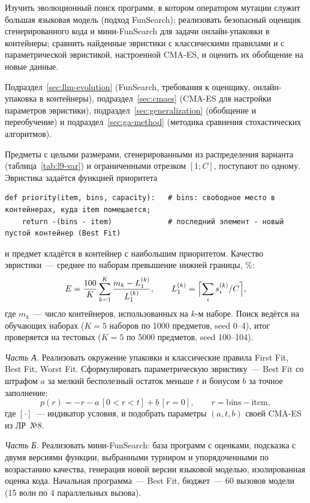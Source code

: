 
Изучить эволюционный поиск программ, в котором оператором мутации служит большая языковая модель
(подход FunSearch); реализовать безопасный оценщик сгенерированного кода и мини-FunSearch для задачи
онлайн-упаковки в контейнеры; сравнить найденные эвристики с классическими правилами и с параметрической
эвристикой, настроенной CMA-ES, и оценить их обобщение на новые данные.

Подраздел~\ref{sec:llm-evolution} (FunSearch, требования к оценщику, онлайн-упаковка в контейнеры),
подраздел~\ref{sec:cmaes} (CMA-ES для настройки параметров эвристики), подраздел~\ref{sec:generalization}
(обобщение и переобучение) и подраздел~\ref{sec:ga-method} (методика сравнения стохастических алгоритмов).

Предметы с целыми размерами, сгенерированными из распределения варианта (таблица~\ref{tab:l9-var}) и
ограниченными отрезком $[1; C]$, поступают по одному. Эвристика задаётся функцией приоритета
\begin{lstlisting}
def priority(item, bins, capacity):   # bins: свободное место в контейнерах, куда item помещается;
    return -(bins - item)             # последний элемент - новый пустой контейнер (Best Fit)
\end{lstlisting}
и предмет кладётся в контейнер с наибольшим приоритетом. Качество эвристики~--- среднее по наборам
превышение нижней границы, \%:
$$
E = \frac{100}{K} \sum_{k=1}^{K} \frac{m_k - L_1^{(k)}}{L_1^{(k)}}, \qquad
L_1^{(k)} = \Bigl\lceil \sum_i s_i^{(k)} / C \Bigr\rceil,
$$
где $m_k$~--- число контейнеров, использованных на $k$-м наборе. Поиск ведётся на обучающих наборах
($K = 5$ наборов по 1000 предметов, seed 0--4), итог проверяется на тестовых ($K = 5$ по 5000
предметов, seed 100--104).

\emph{Часть А.} Реализовать окружение упаковки и классические правила First Fit, Best Fit, Worst Fit.
Сформулировать параметрическую эвристику~--- Best Fit со штрафом $a$ за мелкий бесполезный остаток
меньше $t$ и бонусом $b$ за точное заполнение:
$$
p(r) = -r - a\,[0 < r < t] + b\,[r = 0], \qquad r = \text{bins} - \text{item},
$$
где $[\cdot]$~--- индикатор условия, и подобрать параметры $(a, t, b)$ своей CMA-ES из ЛР~№8.

\emph{Часть Б.} Реализовать мини-FunSearch: база программ с оценками, подсказка с двумя версиями
функции, выбранными турниром и упорядоченными по возрастанию качества, генерация новой версии языковой
моделью, изолированная оценка кода. Начальная программа~--- Best Fit, бюджет~--- 60 вызовов модели
(15 волн по 4 параллельных вызова).

